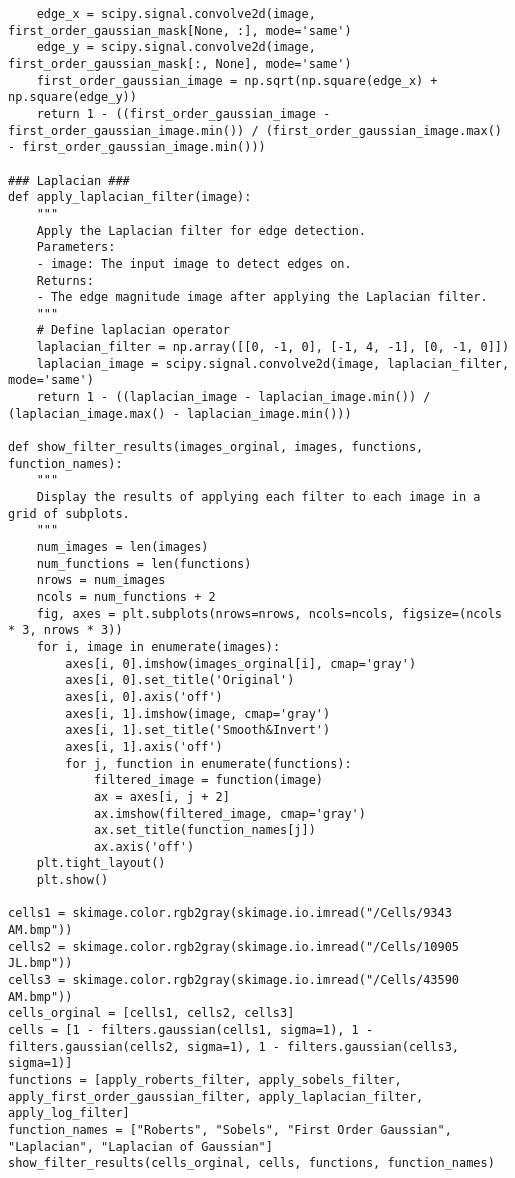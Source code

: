 \documentclass[11pt]{article}
\begin{document}
\begin{lstlisting}
    edge_x = scipy.signal.convolve2d(image, first_order_gaussian_mask[None, :], mode='same')
    edge_y = scipy.signal.convolve2d(image, first_order_gaussian_mask[:, None], mode='same')
    first_order_gaussian_image = np.sqrt(np.square(edge_x) + np.square(edge_y))
    return 1 - ((first_order_gaussian_image - first_order_gaussian_image.min()) / (first_order_gaussian_image.max() - first_order_gaussian_image.min()))

### Laplacian ###
def apply_laplacian_filter(image):
    """
    Apply the Laplacian filter for edge detection.
    Parameters:
    - image: The input image to detect edges on.
    Returns:
    - The edge magnitude image after applying the Laplacian filter.
    """
    # Define laplacian operator
    laplacian_filter = np.array([[0, -1, 0], [-1, 4, -1], [0, -1, 0]])
    laplacian_image = scipy.signal.convolve2d(image, laplacian_filter, mode='same')
    return 1 - ((laplacian_image - laplacian_image.min()) / (laplacian_image.max() - laplacian_image.min()))

def show_filter_results(images_orginal, images, functions, function_names):
    """
    Display the results of applying each filter to each image in a grid of subplots.
    """
    num_images = len(images)
    num_functions = len(functions)
    nrows = num_images
    ncols = num_functions + 2 
    fig, axes = plt.subplots(nrows=nrows, ncols=ncols, figsize=(ncols * 3, nrows * 3))
    for i, image in enumerate(images):
        axes[i, 0].imshow(images_orginal[i], cmap='gray')
        axes[i, 0].set_title('Original')
        axes[i, 0].axis('off')
        axes[i, 1].imshow(image, cmap='gray')
        axes[i, 1].set_title('Smooth&Invert')
        axes[i, 1].axis('off')
        for j, function in enumerate(functions):
            filtered_image = function(image)
            ax = axes[i, j + 2] 
            ax.imshow(filtered_image, cmap='gray')
            ax.set_title(function_names[j])
            ax.axis('off')
    plt.tight_layout()
    plt.show()

cells1 = skimage.color.rgb2gray(skimage.io.imread("/Cells/9343 AM.bmp"))
cells2 = skimage.color.rgb2gray(skimage.io.imread("/Cells/10905 JL.bmp"))
cells3 = skimage.color.rgb2gray(skimage.io.imread("/Cells/43590 AM.bmp"))
cells_orginal = [cells1, cells2, cells3]
cells = [1 - filters.gaussian(cells1, sigma=1), 1 - filters.gaussian(cells2, sigma=1), 1 - filters.gaussian(cells3, sigma=1)]
functions = [apply_roberts_filter, apply_sobels_filter, apply_first_order_gaussian_filter, apply_laplacian_filter, apply_log_filter]
function_names = ["Roberts", "Sobels", "First Order Gaussian", "Laplacian", "Laplacian of Gaussian"]
show_filter_results(cells_orginal, cells, functions, function_names)
\end{lstlisting}
\end{document}
